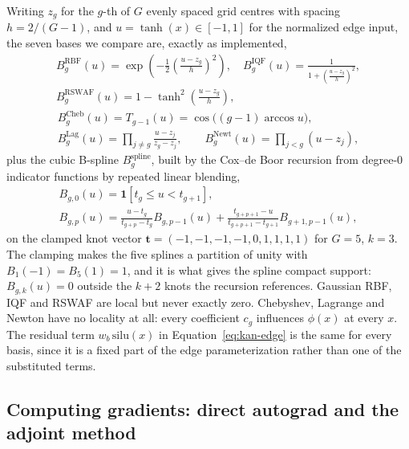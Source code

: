 Writing $z_g$ for the $g$-th of $G$ evenly spaced grid centres with spacing
$h=2/(G-1)$, and $u=\tanh(x)\in[-1,1]$ for the normalized edge input, the
seven bases we compare are, exactly as implemented,
\begin{gather}
B_g^{\text{RBF}}(u)=\exp\!\left(-\tfrac12\left(\tfrac{u-z_g}{h}\right)^2\right),\quad
B_g^{\text{IQF}}(u)=\frac{1}{1+\left(\frac{u-z_g}{h}\right)^2}, \nonumber\\
B_g^{\text{RSWAF}}(u)=1-\tanh^2\!\left(\tfrac{u-z_g}{h}\right),
\label{eq:basis-rbf-spline}
\end{gather}
\begin{gather}
B_g^{\text{Cheb}}(u)=T_{g-1}(u)=\cos\big((g-1)\arccos u\big), \nonumber\\
B_g^{\text{Lag}}(u)=\prod_{j\neq g}\frac{u-z_j}{z_g-z_j}, \qquad
B_g^{\text{Newt}}(u)=\prod_{j<g}(u-z_j),
\label{eq:basis-poly}
\end{gather}
plus the cubic B-spline $B_g^{\text{spline}}$, built by the Cox--de Boor
recursion from degree-0 indicator functions by repeated linear blending,
\begin{gather}
B_{g,0}(u)=\mathbf{1}[t_g\le u<t_{g+1}], \nonumber\\
B_{g,p}(u)=\frac{u-t_g}{t_{g+p}-t_g}B_{g,p-1}(u)+\frac{t_{g+p+1}-u}{t_{g+p+1}-t_{g+1}}B_{g+1,p-1}(u),
\label{eq:cox-de-boor}
\end{gather}
on the clamped knot vector $\mathbf{t}=(-1,-1,-1,-1,0,1,1,1,1)$ for $G=5$,
$k=3$. The clamping makes the five splines a partition of unity with
$B_1(-1)=B_5(1)=1$, and it is what gives the spline compact support:
$B_{g,k}(u)=0$ outside the $k+2$ knots the recursion references. Gaussian
RBF, IQF and RSWAF are local but never exactly zero. Chebyshev, Lagrange and
Newton have no locality at all: every coefficient $c_g$ influences $\phi(x)$
at every $x$. The residual term $w_b\,\mathrm{silu}(x)$ in
Equation~\ref{eq:kan-edge} is the same for every basis, since it is a fixed
part of the edge parameterization rather than one of the substituted terms.

\subsection{Computing gradients: direct autograd and the adjoint method}
\label{sec:gradients}

